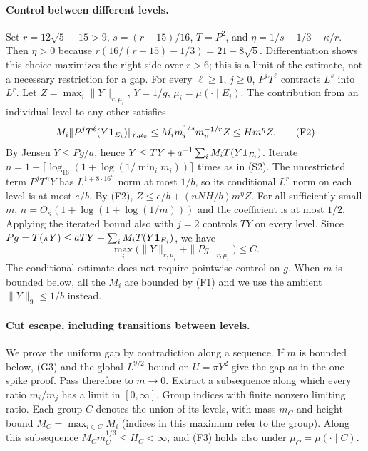 \paragraph{Control between different levels.}
Set $r=12\sqrt5-15>9$, $s=(r+15)/16$, $T=P^2$, and
$\eta=1/s-1/3-\kappa/r$. Then $\eta>0$ because
$r(16/(r+15)-1/3)=21-8\sqrt5$. Differentiation shows this choice
maximizes the right side over $r>6$; this is a limit of the estimate,
not a necessary restriction for a gap. For every $\ell\ge1$, $j\ge0$,
$P^j T^\ell$ contracts $L^s$ into $L^r$.
Let $Z=\max_i\|Y\|_{r,\mu_i}$, $Y=1/g$, $\mu_i=\mu(\cdot\mid E_i)$.
The contribution from an individual level to any other satisfies
\[
 M_i\|P^jT^\ell(Y{\bf1}_{E_i})\|_{r,\mu_v}
 \le M_i m_i^{1/s}m_v^{-1/r} Z
 \le H m^\eta Z. \tag{F2}
\]
By Jensen $Y\le Pg/a$, hence
$Y\le TY+a^{-1}\sum_i M_iT(Y{\bf1}_{E_i})$.
Iterate $n=1+\lceil\log_{16}(1+\log(1/\min_i m_i))\rceil$ times
as in (S2). The unrestricted term $P^jT^nY$ has $L^{1+8\cdot16^n}$
norm at most $1/b$, so its conditional $L^r$ norm on each level is
at most $e/b$. By (F2), $Z\le e/b+(nNH/b)m^\eta Z$. For all
sufficiently small $m$, $n=O_\kappa(1+\log(1+\log(1/m)))$ and
the coefficient is at most $1/2$. Applying the iterated bound also
with $j=2$ controls $TY$ on every level. Since
$Pg=T(\pi Y)\le aTY+\sum_i M_iT(Y{\bf1}_{E_i})$, we have
\[
 \max_i\big(\|Y\|_{r,\mu_i}+\|Pg\|_{r,\mu_i}\big)\le C. \tag{F3}
\]
The conditional estimate does not require pointwise control on $g$.
When $m$ is bounded below, all the $M_i$ are bounded by (F1) and we
use the ambient $\|Y\|_9\le1/b$ instead.

\paragraph{Cut escape, including transitions between levels.}
We prove the uniform gap by contradiction along a sequence. If $m$
is bounded below, (G3) and the global $L^{9/2}$ bound on $U=\pi Y^2$
give the gap as in the one-spike proof. Pass therefore to $m\to0$.
Extract a subsequence along which every ratio $m_i/m_j$ has a limit
in $[0,\infty]$. Group indices with finite nonzero limiting ratio.
Each group $C$ denotes the union of its levels, with mass $m_C$ and
height bound $M_C=\max_{i\in C}M_i$ (indices in this maximum refer
to the group). Along this subsequence $M_Cm_C^{1/3}\le H_C<\infty$,
and (F3) holds also under $\mu_C=\mu(\cdot\mid C)$.

